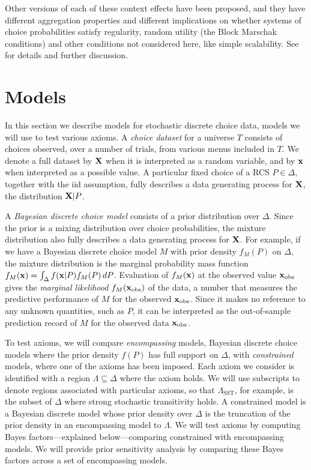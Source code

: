 \documentclass[11pt,letter]{article}
\newcommand{\menus}{menus}
\begin{document}
Other versions of each of these context effects have been proposed, and they have different aggregation properties and different implications on whether systems of choice probabilities satisfy regularity, random utility (the Block Marschak conditions) and other conditions not considered here, like simple scalability.
See  for details and further discussion.

\section{Models}\label{s:models}

In this section we describe models for stochastic discrete choice data, models we will use to test various axioms.
A {\em choice dataset} for a universe $T$ consists of choices observed, over a number of trials, from various \menus{} included in $T$.
We denote a full dataset by $\bf{X}$ when it is interpreted as a random variable, and by $\bf{x}$ when interpreted as a possible value.
A particular fixed choice of a RCS $P \in \Delta$, together with the iid assumption, fully describes a data generating process for $\bf{X}$, the distribution ${\bf X}|P$.

A {\em Bayesian discrete choice model} consists of a prior distribution over $\Delta$.
Since the prior is a mixing distribution over choice probabilities, the mixture distribution also fully describes a data generating process for ${\bf X}$.
For example, if we have a Bayesian discrete choice model $M$ with prior density $f_M(P)$ on $\Delta$, the mixture distribution is the marginal probability mass function $f_M({\bf x}) = \int_\Delta f({\bf x}|P) f_M(P) \,dP$.
Evaluation of $f_M({\bf x})$ at the observed value ${\bf x}_{\mathrm{obs}}$ gives the {\em marginal likelihood} $f_M({\bf x}_{\mathrm{obs}})$ of the data, a number that measures the predictive performance of $M$ for the observed ${\bf x}_{\mathrm{obs}}$.
Since it makes no reference to any unknown quantities, such as $P$, it can be interpreted as the out-of-sample prediction record of $M$ for the observed data ${\bf x}_{\mathrm{obs}}$.

To test axioms, we will compare {\em encompassing} models, Bayesian discrete choice models where the prior density $f(P)$ has full support on $\Delta$, with {\em constrained} models, where one of the axioms has been imposed.
Each axiom we consider is identified with a region $\Lambda \subseteq \Delta$ where the axiom holds.
We will use subscripts to denote regions associated with particular axioms, so that $\Lambda_{\mathrm{SST}}$, for example, is the subset of $\Delta$ where strong stochastic transitivity holds.
A constrained model is a Bayesian discrete model whose prior density over $\Delta$ is the truncation of the prior density in an encompassing model to $\Lambda$.
We will test axioms by computing Bayes factors---explained below---comparing constrained with encompassing models.
We will provide prior sensitivity analysis by comparing these Bayes factors across a set of encompassing models.
\end{document}
